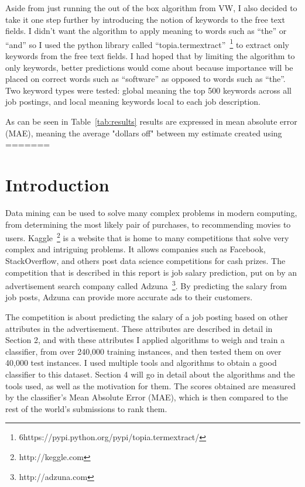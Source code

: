 \documentclass[conference]{IEEEtran}
\begin{document}
Aside from just running the out of the box algorithm
from VW, I also decided to take it one step further by introducing the notion of keywords to the free text fields. I didn't
want the algorithm to apply meaning to words such as ``the'' or ``and'' so I used the python library called 
``topia.termextract''~\footnote{6https://pypi.python.org/pypi/topia.termextract/}
to extract only keywords from the free text fields. I had hoped that by limiting the algorithm to only keywords, better
predictions would come about because importance will be placed on correct words such as ``software'' as opposed to words such as
``the''. Two keyword types were tested: global meaning the top 500 keywords across all job postings, and local meaning keywords
local to each job description.

As can be seen in Table~\ref{tab:results} results are expressed in
mean absolute error (MAE), meaning the average "dollars oﬀ" between my estimate created using
=======
\section{Introduction}

Data mining can be used to solve many complex problems in modern computing, from determining the most
likely pair of purchases, to recommending movies to users.
Kaggle~\footnote{http://keggle.com}
is a website that is home to many competitions that solve very complex and intriguing problems. It allows companies 
such as Facebook, StackOverﬂow, and others post data science competitions for cash prizes. The competition that is 
described in this report is job salary prediction, put on by an advertisement search company called 
Adzuna~\footnote{http://adzuna.com}. By predicting the
salary from job posts, Adzuna can provide more accurate ads to their customers. 

The competition is about predicting the 
salary of a job posting based on other attributes in the advertisement. These attributes are described in detail in Section 2, 
and with these attributes I applied algorithms to weigh and train a classifier, from over 240,000 training instances, 
and then tested them on over 40,000 test instances. I used multiple tools and algorithms to obtain a good classifier to this dataset. 
Section 4 will go in detail about the algorithms and the tools used, as well as the motivation for them. The scores obtained are 
measured by the classifier's Mean Absolute Error (MAE), which is then compared to the rest of the world’s submissions to rank them.
\end{document}
